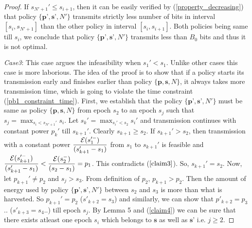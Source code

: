 \begin{proof}
If $s_{N'+1}'\le s_{i+1}$, then it can be easily verified by (\ref{property_decreasing}) that policy $\{\textbf{p'},\textbf{s'},N'\}$ transmits strictly less number of bits in interval $[s_i,s_{N'+1}]$ than the other policy in interval $[s_{i},s_{i+1}]$. Both policies being same till $s_i$, we conclude that policy $\{\textbf{p'},\textbf{s'},N'\}$ transmits less than $B_0$  bits and thus it is not optimal.

\textit{Case3}: This case argues the infeasibility when $s_1'<s_1$. Unlike other cases this case is more laborious. The idea of the proof is to show that if a policy starts its transmission early and finishes earlier than policy $\{\textbf{p},\textbf{s},N\}$, it always takes more transmission time, which is going to violate the time constraint (\ref{pb1_constraint_time}). First, we establish that the policy $\{\textbf{p'},\textbf{s'},N'\}$ must be same as policy $\{\textbf{p},\textbf{s},N\}$ from epoch $s_2$ to an epoch $s_j$ such that $s_j=\displaystyle\max_{s_i<s_{N'+1}'} s_i$. Let $s_k'=\displaystyle\max_{s_i'<s_2}s_i'$ and transmission continues with constant power $p_k'$ till $s_{k+1}'$. Clearly $s_{k+1}\ge s_2$. If $s_{k+1}'>s_2$, then transmission with a constant power $\dfrac{\mathcal{E}(s_1'^-)}{(s_{k+1}'-s_1)} $ from $s_1$ to $s_{k+1}'$ is feasible and $\dfrac{\mathcal{E}(s_{k+1}'^-)}{(s_{k+1}'-s_1)}<\dfrac{\mathcal{E}(s_2^-)}{(s_2-s_1)}=p_1$. This contradicts ($\ref{claim3}$). So, $s_{k+1}'=s_2$. Now, let $p_{k+1}'\neq p_2$ and $s_j>s_3$. From definition of $p_2$, $p_{k+1}>p_2$. Then the amount of energy used by policy $\{\textbf{p'},\textbf{s'},N'\}$ between $s_2$ and $s_3$ is more than what is harvested. So $p_{k+1}'=p_2$ ($s'_{k+2}=s_3$) and similarly, we can show that $p'_{k+2}=p_3$.. ($ s'_{k+3}=s_4$..) till epoch $s_j$. By Lemma 5 and (\ref{claim4}) we can be sure that there exists atleast one epoch $s_i$ which belongs to $\textbf{s}$ as well as $\textbf{s'}$ i.e. $j\ge 2$.


\end{proof}
